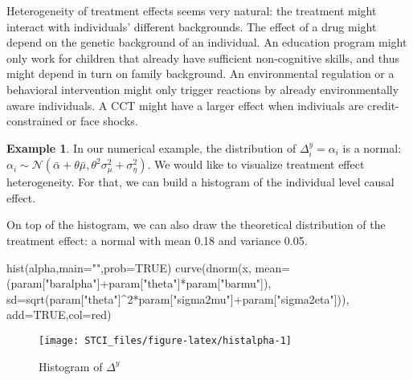 \documentclass[
]{book}
\newenvironment{Shaded}{\begin{snugshade}}{\end{snugshade}}
\newcommand{\AttributeTok}[1]{\textcolor[rgb]{0.77,0.63,0.00}{#1}}
\newcommand{\ConstantTok}[1]{\textcolor[rgb]{0.00,0.00,0.00}{#1}}
\newcommand{\DecValTok}[1]{\textcolor[rgb]{0.00,0.00,0.81}{#1}}
\newcommand{\FunctionTok}[1]{\textcolor[rgb]{0.00,0.00,0.00}{#1}}
\newcommand{\NormalTok}[1]{#1}
\newcommand{\SpecialCharTok}[1]{\textcolor[rgb]{0.00,0.00,0.00}{#1}}
\newcommand{\StringTok}[1]{\textcolor[rgb]{0.31,0.60,0.02}{#1}}
\theoremstyle{definition}
\theoremstyle{definition}
\newtheorem{example}{Example}[chapter]
\theoremstyle{definition}
\theoremstyle{definition}
\theoremstyle{remark}
\begin{document}
Heterogeneity of treatment effects seems very natural: the treatment might interact with individuals' different backgrounds.
The effect of a drug might depend on the genetic background of an individual.
An education program might only work for children that already have sufficient non-cognitive skills, and thus might depend in turn on family background.
An environmental regulation or a behavioral intervention might only trigger reactions by already environmentally aware individuals.
A CCT might have a larger effect when indiviuals are credit-constrained or face shocks.

\begin{example}
\protect\hypertarget{exm:unnamed-chunk-8}{}{\label{exm:unnamed-chunk-8} }In our numerical example, the distribution of \(\Delta^y_i=\alpha_i\) is a normal: \(\alpha_i\sim\mathcal{N}(\bar{\alpha}+\theta\bar{\mu},\theta^2\sigma^2_{\mu}+\sigma^2_{\eta})\).
We would like to visualize treatment effect heterogeneity.
For that, we can build a histogram of the individual level causal effect.
\end{example}
On top of the histogram, we can also draw the theoretical distribution of the treatment effect: a normal with mean 0.18 and variance 0.05.

\begin{Shaded}
\begin{Highlighting}[]
\FunctionTok{hist}\NormalTok{(alpha,}\AttributeTok{main=}\StringTok{""}\NormalTok{,}\AttributeTok{prob=}\ConstantTok{TRUE}\NormalTok{)}
\FunctionTok{curve}\NormalTok{(}\FunctionTok{dnorm}\NormalTok{(x, }\AttributeTok{mean=}\NormalTok{(param[}\StringTok{"baralpha"}\NormalTok{]}\SpecialCharTok{+}\NormalTok{param[}\StringTok{"theta"}\NormalTok{]}\SpecialCharTok{*}\NormalTok{param[}\StringTok{"barmu"}\NormalTok{]), }\AttributeTok{sd=}\FunctionTok{sqrt}\NormalTok{(param[}\StringTok{"theta"}\NormalTok{]}\SpecialCharTok{\^{}}\DecValTok{2}\SpecialCharTok{*}\NormalTok{param[}\StringTok{"sigma2mu"}\NormalTok{]}\SpecialCharTok{+}\NormalTok{param[}\StringTok{"sigma2eta"}\NormalTok{])), }\AttributeTok{add=}\ConstantTok{TRUE}\NormalTok{,}\AttributeTok{col=}\StringTok{\textquotesingle{}red\textquotesingle{}}\NormalTok{)}
\end{Highlighting}
\end{Shaded}

\begin{figure}[htbp]

{\centering \texttt{[image: STCI\_files/figure-latex/histalpha-1]} 

}

\caption{Histogram of $\Delta^y$}\label{fig:histalpha}
\end{figure}
\end{document}
